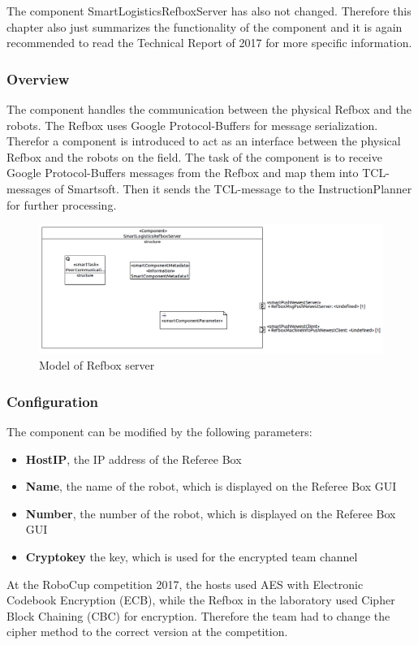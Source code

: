 The component SmartLogisticsRefboxServer has also not changed.
Therefore this chapter also just summarizes the functionality of the component and it is again recommended to read the Technical Report of 2017 \cite{TR17} for more specific information.

\subsubsection{Overview}

The component handles the communication between the physical Refbox and the robots. The Refbox uses Google Protocol-Buffers for message serialization. Therefor a component is introduced to act as an interface between the physical Refbox and the robots on the field. The task of the component is to receive Google Protocol-Buffers messages from the Refbox and map them into TCL-messages of Smartsoft. Then it sends the TCL-message to the InstructionPlanner for further processing.

\begin{figure}[!h]
\centering
\includegraphics[width=\linewidth]{pic/component_refbox_server.png}
\caption{Model of Refbox server}
\label{fig:modelRefboxServer}
\end{figure}


\subsubsection{Configuration}

The component can be modified by the following parameters:
\begin{itemize}
\item \textbf{HostIP}, the IP address of the Referee Box
\item \textbf{Name}, the name of the robot, which is displayed on the Referee Box GUI
\item \textbf{Number}, the number of the robot, which is displayed on the Referee Box GUI
\item \textbf{Cryptokey} the key, which is used for the encrypted team channel
\end{itemize}

At the RoboCup competition 2017, the hosts used AES with Electronic Codebook Encryption (ECB), while the Refbox in the laboratory used Cipher Block Chaining (CBC) for encryption. Therefore the team had to change the cipher method to the correct version at the competition.
